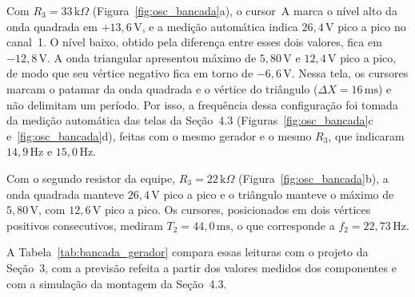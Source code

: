 \documentclass[11pt,a4paper]{article}
\begin{document}
Com $R_3 = 33\,\text{k}\Omega$ (Figura~\ref{fig:osc_bancada}a), o cursor~A marca o nível alto da onda quadrada em $+13{,}6\,\text{V}$, e a medição automática indica $26{,}4\,\text{V}$ pico a pico no canal~1. O nível baixo, obtido pela diferença entre esses dois valores, fica em $-12{,}8\,\text{V}$. A onda triangular apresentou máximo de $5{,}80\,\text{V}$ e $12{,}4\,\text{V}$ pico a pico, de modo que seu vértice negativo fica em torno de $-6{,}6\,\text{V}$. Nessa tela, os cursores marcam o patamar da onda quadrada e o vértice do triângulo ($\Delta X = 16\,\text{ms}$) e não delimitam um período. Por isso, a frequência dessa configuração foi tomada da medição automática das telas da Seção~4.3 (Figuras~\ref{fig:osc_bancada}c e~\ref{fig:osc_bancada}d), feitas com o mesmo gerador e o mesmo $R_3$, que indicaram $14{,}9\,\text{Hz}$ e $15{,}0\,\text{Hz}$.

Com o segundo resistor da equipe, $R_3 = 22\,\text{k}\Omega$ (Figura~\ref{fig:osc_bancada}b), a onda quadrada manteve $26{,}4\,\text{V}$ pico a pico e o triângulo manteve o máximo de $5{,}80\,\text{V}$, com $12{,}6\,\text{V}$ pico a pico. Os cursores, posicionados em dois vértices positivos consecutivos, mediram $T_2 = 44{,}0\,\text{ms}$, o que corresponde a $f_2 = 22{,}73\,\text{Hz}$.

A Tabela~\ref{tab:bancada_gerador} compara essas leituras com o projeto da Seção~3, com a previsão refeita a partir dos valores medidos dos componentes e com a simulação da montagem da Seção~4.3.
\end{document}
